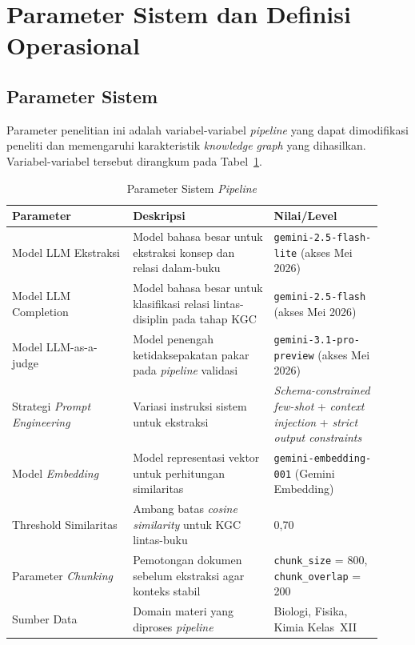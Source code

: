 \documentclass[../../thesis]{subfiles}
\begin{document}
\section{Parameter Sistem dan Definisi Operasional}

\subsection{Parameter Sistem}
\label{subsec:parameter-sistem}

Parameter penelitian ini adalah variabel-variabel \textit{pipeline} yang
dapat dimodifikasi peneliti dan memengaruhi karakteristik \textit{knowledge
graph} yang dihasilkan. Variabel-variabel tersebut dirangkum pada
Tabel~\ref{tab:parameter}.

\begin{table}[htbp]
\centering
\caption{Parameter Sistem \textit{Pipeline}}
\label{tab:parameter}
\begin{tabular}{@{}p{0.30\linewidth}p{0.35\linewidth}p{0.27\linewidth}@{}}
  \toprule
  \textbf{Parameter} & \textbf{Deskripsi} & \textbf{Nilai/Level} \\
  \midrule
  Model LLM Ekstraksi
    & Model bahasa besar untuk ekstraksi konsep dan relasi dalam-buku
    & {\scriptsize \texttt{gemini-2.5-flash-lite} (akses Mei 2026)} \\
  Model LLM Completion
    & Model bahasa besar untuk klasifikasi relasi lintas-disiplin pada tahap KGC
    & {\scriptsize \texttt{gemini-2.5-flash} (akses Mei 2026)} \\
  Model LLM-as-a-judge
    & Model penengah ketidaksepakatan pakar pada \textit{pipeline} validasi
    & {\scriptsize \texttt{gemini-3.1-pro-preview} (akses Mei 2026)} \\
  Strategi \textit{Prompt Engineering}
    & Variasi instruksi sistem untuk ekstraksi
    & \textit{Schema-constrained few-shot} + \textit{context injection}
      + \textit{strict output constraints} \\
  Model \textit{Embedding}
    & Model representasi vektor untuk perhitungan similaritas
    & \texttt{gemini-embedding-001} (Gemini Embedding) \\
  Threshold Similaritas
    & Ambang batas \textit{cosine similarity} untuk KGC lintas-buku
    & 0,70 \\
  Parameter \textit{Chunking}
    & Pemotongan dokumen sebelum ekstraksi agar konteks stabil
    & \texttt{chunk\_size} = 800, \texttt{chunk\_overlap} = 200 \\
  Sumber Data
    & Domain materi yang diproses \textit{pipeline}
    & Biologi, Fisika, Kimia Kelas~XII \\
\end{tabular}
\end{table}
\end{document}
